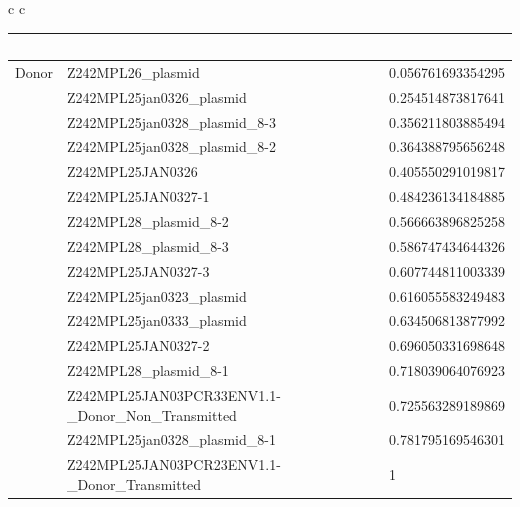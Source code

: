 \documentclass[conference]{IEEEtran}
\begin{document}
\begin{table}[]
\begin{tabular}{ c c}
\begin{tabular}{l l l}
	& \ &\ \\
	\hline
Donor &	Z242MPL26\_plasmid	&	0.056761693354295	\\
&	Z242MPL25jan0326\_plasmid	&	0.254514873817641	\\
&	Z242MPL25jan0328\_plasmid\_8-3	&	0.356211803885494	\\
&	Z242MPL25jan0328\_plasmid\_8-2	&	0.364388795656248	\\
&	Z242MPL25JAN0326	&	0.405550291019817	\\
&	Z242MPL25JAN0327-1	&	0.484236134184885	\\
&	Z242MPL28\_plasmid\_8-2	&	0.566663896825258	\\
&	Z242MPL28\_plasmid\_8-3	&	0.586747434644326	\\
&	Z242MPL25JAN0327-3	&	0.607744811003339	\\
&	Z242MPL25jan0323\_plasmid	&	0.616055583249483	\\
&	Z242MPL25jan0333\_plasmid	&	0.634506813877992	\\
&	Z242MPL25JAN0327-2	&	0.696050331698648	\\
&	Z242MPL28\_plasmid\_8-1	&	0.718039064076923	\\
&	Z242MPL25JAN03PCR33ENV1.1-\_Donor\_Non\_Transmitted	&	0.725563289189869	\\
&	Z242MPL25jan0328\_plasmid\_8-1	&	0.781795169546301	\\
&	Z242MPL25JAN03PCR23ENV1.1-\_Donor\_Transmitted	&	1	\\


\end{tabular}
\end{tabular}
\end{table}
\end{document}
